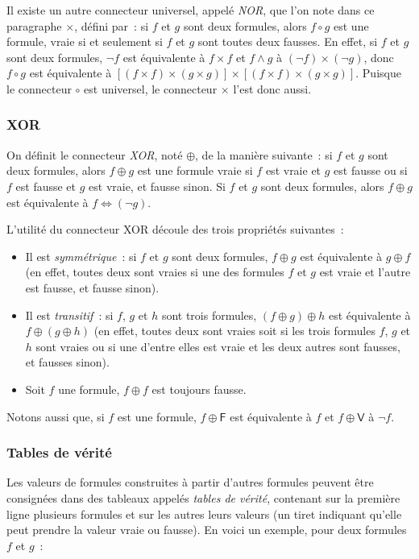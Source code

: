 Il existe un autre connecteur universel, appelé \textit{NOR}, que l'on note dans ce paragraphe $\times$, défini par : si $f$ et $g$ sont deux formules, alors $f \circ g$ est une formule, vraie si et seulement si $f$ et $g$ sont toutes deux fausses. 
En effet, si $f$ et $g$ sont deux formules, $\neg f$ est équivalente à $f \times f$ et $f \wedge g$ à $(\neg f) \times (\neg g)$, donc $f \circ g$ est équivalente à $[(f \times f) \times (g \times g)] \times [(f \times f) \times (g \times g)]$. 
Puisque le connecteur $\circ$ est universel, le connecteur $\times$ l'est donc aussi.

\subsubsection{XOR} 
\label{subsub:XOR}

On définit le connecteur \textit{XOR}, noté $\oplus$, de la manière suivante : si $f$ et $g$ sont deux formules, alors $f \oplus g$ est une formule vraie si $f$ est vraie et $g$ est fausse ou si $f$ est fausse et $g$ est vraie, et fausse sinon. 
Si $f$ et $g$ sont deux formules, alors $f \oplus g$ est équivalente à $f \Leftrightarrow (\neg g)$. 

L'utilité du connecteur XOR découle des trois propriétés suivantes : 
\begin{itemize}[nosep]
    \item Il est \textit{symmétrique} : si $f$ et $g$ sont deux formules, $f \oplus g$ est équivalente à $g \oplus f$ (en effet, toutes deux sont vraies si une des formules $f$ et $g$ est vraie et l'autre est fausse, et fausse sinon).
    \item Il est \textit{transitif} : si $f$, $g$ et $h$ sont trois formules, $(f \oplus g) \oplus h$ est équivalente à $f \oplus (g \oplus h)$ (en effet, toutes deux sont vraies soit si les trois formules $f$, $g$ et $h$ sont vraies ou si une d'entre elles est vraie et les deux autres sont fausses, et fausses sinon).
    \item Soit $f$ une formule, $f \oplus f$ est toujours fausse.
\end{itemize}
Notons aussi que, si $f$ est une formule, $f \oplus \mathsf{F}$ est équivalente à $f$ et $f \oplus \mathsf{V}$ à $\neg f$.

\subsubsection{Tables de vérité}

Les valeurs de formules construites à partir d'autres formules peuvent être consignées dans des tableaux appelés \textit{tables de vérité}, contenant sur la première ligne plusieurs formules et sur les autres leurs valeurs (un tiret indiquant qu'elle peut prendre la valeur vraie ou fausse). 
En voici un exemple, pour deux formules $f$ et $g$ : 


